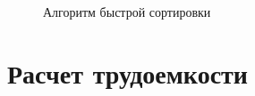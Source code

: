 \documentclass[a4paper,12pt]{report}
\begin{document}
\begin{figure}[ht!]
\caption{Алгоритм быстрой сортировки}
\end{figure}
\newpage


\section{Расчет трудоемкости}
\end{document}
